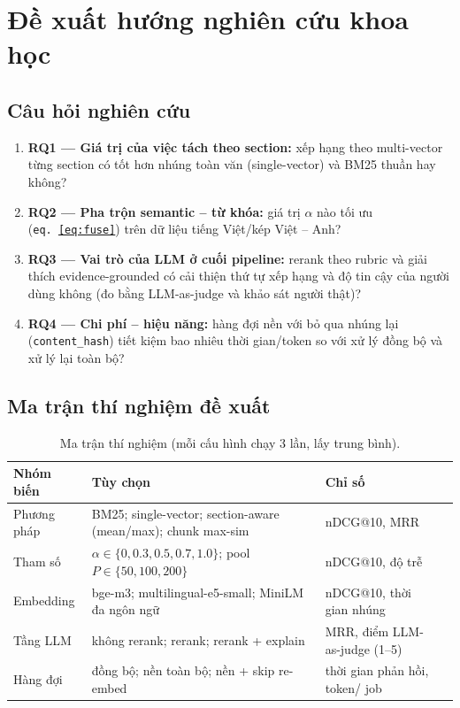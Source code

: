 \documentclass[a4paper,11pt]{article}
\begin{document}
\section{Đề xuất hướng nghiên cứu khoa học}

\subsection{Câu hỏi nghiên cứu}

\begin{enumerate}[leftmargin=1.5em]
  \item \textbf{RQ1 --- Giá trị của việc tách theo section:} xếp hạng theo multi-vector
        từng section có tốt hơn nhúng toàn văn (single-vector) và BM25 thuần hay không?
  \item \textbf{RQ2 --- Pha trộn semantic -- từ khóa:} giá trị $\alpha$ nào tối ưu
        (\texttt{eq.~\ref{eq:fuse}}) trên dữ liệu tiếng Việt/kép Việt -- Anh?
  \item \textbf{RQ3 --- Vai trò của LLM ở cuối pipeline:} rerank theo rubric và giải
        thích evidence-grounded có cải thiện thứ tự xếp hạng và độ tin cậy của người
        dùng không (đo bằng LLM-as-judge và khảo sát người thật)?
  \item \textbf{RQ4 --- Chi phí -- hiệu năng:} hàng đợi nền với bỏ qua nhúng lại
        (\texttt{content\_hash}) tiết kiệm bao nhiêu thời gian/token so với xử lý đồng bộ
        và xử lý lại toàn bộ?
\end{enumerate}

\subsection{Ma trận thí nghiệm đề xuất}

\begin{table}[htbp]
\centering\small
\begin{tabular}{@{}llll@{}}
\toprule
\textbf{Nhóm biến} & \textbf{Tùy chọn} & \textbf{Chỉ số} \\
\midrule
Phương pháp & BM25; single-vector; section-aware (mean/max); chunk max-sim & nDCG@10, MRR \\
Tham số & $\alpha\in\{0,0.3,0.5,0.7,1.0\}$; pool $P\in\{50,100,200\}$ & nDCG@10, độ trễ \\
Embedding & bge-m3; multilingual-e5-small; MiniLM đa ngôn ngữ & nDCG@10, thời gian nhúng \\
Tầng LLM & không rerank; rerank; rerank + explain & MRR, điểm LLM-as-judge (1--5) \\
Hàng đợi & đồng bộ; nền toàn bộ; nền + skip re-embed & thời gian phản hồi, token/ job \\
\bottomrule
\end{tabular}
\caption{Ma trận thí nghiệm (mỗi cấu hình chạy 3 lần, lấy trung bình).}
\label{tab:exp}
\end{table}
\end{document}
